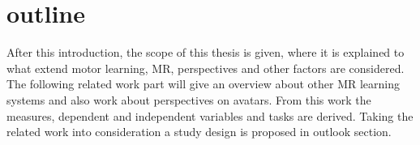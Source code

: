 \section{outline}
After this introduction, the scope of this thesis is given, where it is explained to what extend motor learning, MR, perspectives and other factors are considered. The following related work part will give an overview about other MR learning systems and also work about perspectives on avatars. From this work the measures, dependent and independent variables and tasks are derived. Taking the related work into consideration a study design is proposed in outlook section.

